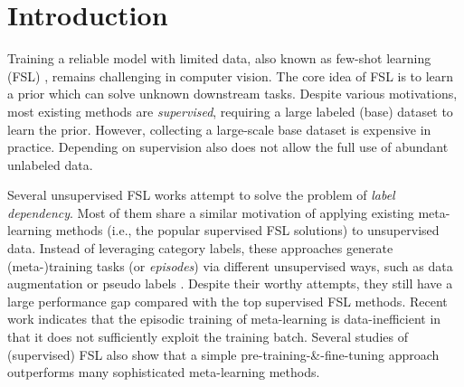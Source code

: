 \documentclass[runningheads]{llncs}
\begin{document}
\section{Introduction}


Training a reliable model with limited data, also known as few-shot learning (FSL) \cite{finn2017model,lee2019meta,radford2021learning,snell2017prototypical,oreshkin2018tadam,tian2020rethinking,lu2022prompt}, remains challenging in computer vision.
The core idea of FSL is to learn a prior which can solve unknown downstream tasks.
Despite various motivations, most existing methods are \textit{supervised}, requiring a large labeled (base) dataset \cite{vinyals2016matching,ren2018meta} to learn the prior. 
However, collecting a large-scale base dataset is expensive in practice. Depending on supervision also does not allow the full use of abundant unlabeled data.

Several unsupervised FSL works \cite{hsu2018unsupervised,khodadadeh2019unsupervised,Antoniou2020Assume,Qin2020ULDA,khodadadeh2021unsupervised} attempt to solve the problem of \textit{label dependency}.
Most of them share a similar motivation of applying existing meta-learning methods (i.e., the popular supervised FSL solutions) to unsupervised data.
Instead of leveraging category labels, these approaches generate (meta-)training tasks (or \textit{episodes}) via different unsupervised ways, such as data augmentation \cite{khodadadeh2019unsupervised} or pseudo labels \cite{hsu2018unsupervised}.
Despite their worthy attempts, they still have a large performance gap compared with the top supervised FSL methods.
Recent work \cite{Laenen2021On} indicates that the episodic training of meta-learning is data-inefficient in that it does not sufficiently exploit the training batch.
Several studies \cite{chen2019a,tian2020rethinking,guo2020a,dhillon2020A} of (supervised) FSL also show that a simple pre-training-\&-fine-tuning approach outperforms many sophisticated meta-learning methods.
\end{document}
